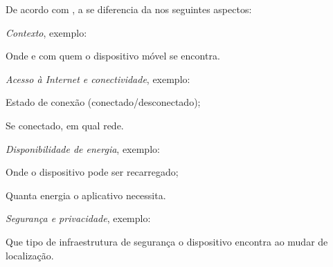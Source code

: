 De acordo com , a \iomt{} se diferencia da \iot{} nos seguintes aspectos:
\begin{alineas}

	\item \emph{Contexto}, exemplo:
		
		\begin{alineas}

			\item Onde e com quem o dispositivo móvel se encontra.

		\end{alineas}

	\item \emph{Acesso à Internet e conectividade}, exemplo:
		
		\begin{alineas}

			\item Estado de conexão (conectado/desconectado);
				
			\item Se conectado, em qual rede.

		\end{alineas}

	\item \emph{Disponibilidade de energia}, exemplo:
		
		\begin{alineas}

			\item Onde o dispositivo pode ser recarregado;
				
			\item Quanta energia o aplicativo necessita.

		\end{alineas}

	\item \emph{Segurança e privacidade}, exemplo:
		
		\begin{alineas}

			\item Que tipo de infraestrutura de segurança o dispositivo encontra ao mudar de localização.

		\end{alineas}

\end{alineas}


\subsection{\mhubcddl{}}

